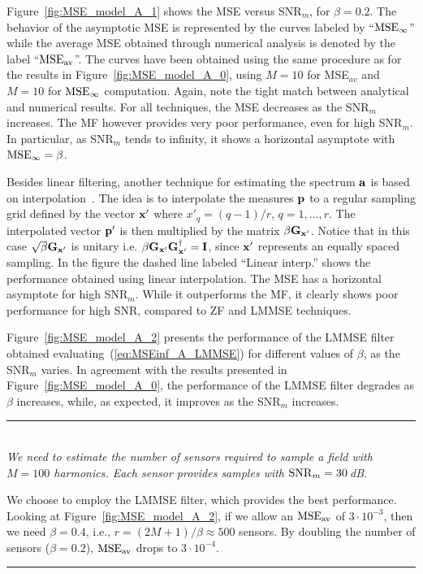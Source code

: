 \documentclass[final, a4paper]{IEEEtran}
\newcommand{\example}[2]{
\begin{center}
\parbox{0.95\columnwidth}{
\rule{0.95\columnwidth}{0.5mm}\\
\noindent {\bf Example~#1:}
#2\\
\rule{0.95\columnwidth}{0.5mm}
}
\end{center}
}
\newcommand{\av}{{\bf a}}
\newcommand{\pv}{{\bf p}}
\newcommand{\xv}{{\bf x}}
\newcommand{\Gm}{{\bf G}}
\newcommand{\Id}{{\bf I}}
\def\MSEav{{\rm MSE}_{\rm av}}
\def\MSEinf{{\rm MSE}_{\infty}}
\begin{document}
Figure~\ref{fig:MSE_model_A_1} shows the MSE versus SNR$_m$, for $\beta=0.2$.
The behavior of the asymptotic MSE is represented by the curves labeled by
``$\MSEinf$'' while the average MSE obtained through numerical analysis is denoted by
the label ``$\MSEav$''. The curves have been obtained using the same procedure as for
the results in Figure~\ref{fig:MSE_model_A_0}, using $M=10$ for MSE$_{av}$ and $M=10$ for $\MSEinf$ computation.
Again, note the tight match between analytical and numerical results.
For all techniques, the MSE decreases as the SNR$_m$ increases.
The MF however provides very poor performance, even for high SNR$_m$. In particular, as
SNR$_m$ tends to infinity, it shows a horizontal asymptote with $\MSEinf=\beta$.

Besides linear filtering, another technique for estimating the spectrum $\av$ is based on
interpolation~\cite{DongTong}.
The idea is to interpolate the measures $\pv$ to a regular sampling grid defined by the vector
$\xv'$ where $x'_q = (q-1)/r$, $q=1,\ldots,r$. The interpolated vector $\pv'$ is then multiplied
by the matrix $\beta\Gm_{\xv'}$. Notice that in this case $\sqrt{\beta}\Gm_{\xv'}$ is unitary i.e.
$\beta\Gm_{\xv'}\Gm_{\xv'}\Herm=\Id$, since $\xv'$ represents an equally spaced sampling.
In the figure the dashed line labeled ``Linear interp.'' shows the performance obtained using linear interpolation. The MSE has a horizontal asymptote for high SNR$_m$. While it outperforms
the MF, it clearly shows poor performance for high SNR, compared to ZF and LMMSE techniques.


Figure~\ref{fig:MSE_model_A_2} presents the performance of the LMMSE filter obtained
evaluating~(\ref{eq:MSEinf_A_LMMSE}) for different values of $\beta$,
as the SNR$_m$ varies.
In agreement with the results presented in Figure~\ref{fig:MSE_model_A_0},
the performance of the LMMSE filter
degrades as $\beta$ increases, while, as expected, it improves as
the SNR$_m$ increases.

\medskip
\example{1}{{\it We need to estimate the number of sensors required
to sample a field with $M=100$ harmonics. Each sensor provides
samples with ${\rm SNR}_m=30$\,dB.}

We choose to employ the LMMSE filter, which provides the best
performance.
Looking at Figure~\ref{fig:MSE_model_A_2}, if we allow an
$\MSEav$ of $3\cdot 10^{-3}$, then we need $\beta=0.4$, i.e., $r=(2M+1)/\beta\approx 500$ sensors.
By doubling the number of sensors ($\beta=0.2$), $\MSEav$ drops to $3\cdot 10^{-4}$.
}
\end{document}
